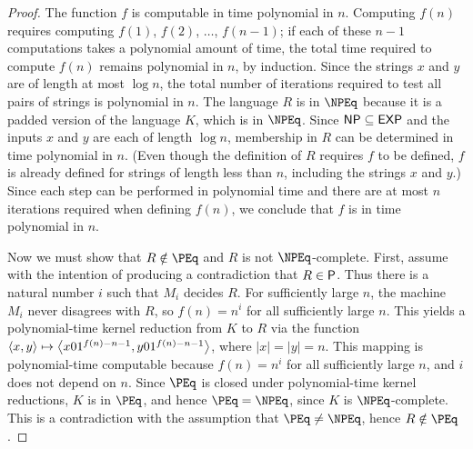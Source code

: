\begin{proof}
  The function $f$ is computable in time polynomial in $n$.
  Computing $f(n)$ requires computing $f(1)$, $f(2)$, $\dotsc$, $f(n - 1)$; if each of these $n - 1$ computations takes a polynomial amount of time, the total time required to compute $f(n)$ remains polynomial in $n$, by induction.
  Since the strings $x$ and $y$ are of length at most $\log n$, the total number of iterations required to test all pairs of strings is polynomial in $n$.
  The language $R$ is in $\NPEq$ because it is a padded version of the language $K$, which is in $\NPEq$.
  Since $\NP \subseteq \EXP$ and the inputs $x$ and $y$ are each of length $\log n$, membership in $R$ can be determined in time polynomial in $n$.
  (Even though the definition of $R$ requires $f$ to be defined, $f$ is already defined for strings of length less than $n$, including the strings $x$ and $y$.)
  Since each step can be performed in polynomial time and there are at most $n$ iterations required when defining $f(n)$, we conclude that $f$ is in time polynomial in $n$.

  Now we must show that $R \notin \PEq$ and $R$ is not $\NPEq$-complete.
  First, assume with the intention of producing a contradiction that $R \in \P$.
  Thus there is a natural number $i$ such that $M_i$ decides $R$.
  For sufficiently large $n$, the machine $M_i$ never disagrees with $R$, so $f(n) = n^i$ for all sufficiently large $n$.
  This yields a polynomial-time kernel reduction from $K$ to $R$ via the function $\pair{x}{y} \mapsto \left\langle x 0 1^{f(n) - n - 1}, y 0 1^{f(n) - n - 1}\right\rangle$, where $|x| = |y| = n$.
  This mapping is polynomial-time computable because $f(n) = n^i$ for all sufficiently large $n$, and $i$ does not depend on $n$.
  Since $\PEq$ is closed under polynomial-time kernel reductions, $K$ is in $\PEq$, and hence $\PEq = \NPEq$, since $K$ is $\NPEq$-complete.
  This is a contradiction with the assumption that $\PEq \neq \NPEq$, hence $R \notin \PEq$.


\end{proof}
